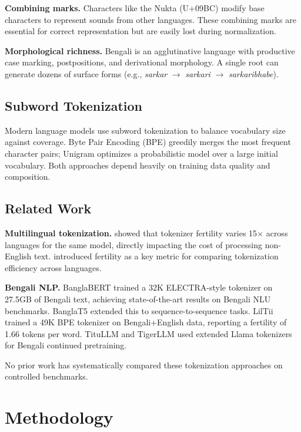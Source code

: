 \documentclass[11pt,a4paper]{article}
\begin{document}
\textbf{Combining marks.} Characters like the Nukta (U+09BC) modify base characters to represent sounds from other languages. These combining marks are essential for correct representation but are easily lost during normalization.

\textbf{Morphological richness.} Bengali is an agglutinative language with productive case marking, postpositions, and derivational morphology. A single root can generate dozens of surface forms (e.g., \textit{sarkar} $\rightarrow$ \textit{sarkari} $\rightarrow$ \textit{sarkaribhabe}).

\subsection{Subword Tokenization}

Modern language models use subword tokenization to balance vocabulary size against coverage.
Byte Pair Encoding (BPE) \cite{sennrich2016bpe} greedily merges the most frequent character pairs; Unigram \cite{kudo2018unigram} optimizes a probabilistic model over a large initial vocabulary.
Both approaches depend heavily on training data quality and composition.

\subsection{Related Work}

\textbf{Multilingual tokenization.} \citet{ahia2023do} showed that tokenizer fertility varies 15$\times$ across languages for the same model, directly impacting the cost of processing non-English text.
\citet{petrov2024language} introduced fertility as a key metric for comparing tokenization efficiency across languages.

\textbf{Bengali NLP.} BanglaBERT \cite{banglabert2022} trained a 32K ELECTRA-style tokenizer on 27.5GB of Bengali text, achieving state-of-the-art results on Bengali NLU benchmarks.
BanglaT5 \cite{banglat5} extended this to sequence-to-sequence tasks.
LilTii \cite{liltii2026} trained a 49K BPE tokenizer on Bengali+English data, reporting a fertility of 1.66 tokens per word.
TituLLM \cite{titulm2025} and TigerLLM \cite{tigerllm2025} used extended Llama tokenizers for Bengali continued pretraining.

No prior work has systematically compared these tokenization approaches on controlled benchmarks.

\section{Methodology}
\end{document}
